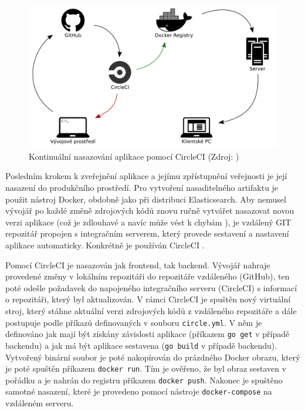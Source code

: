\documentclass[FM,DP]{tulthesis}
\begin{document}
\begin{figure}[h]
\center
\includegraphics[width=\textwidth]{circleci.pdf}
\caption[Kontinuální nasazování aplikace]{Kontinuální nasazování aplikace pomocí CircleCI (Zdroj: \cite{circleci})}
\label{circle-ci}
\end{figure}

Posledním krokem k zveřejnění aplikace a jejímu zpřístupnění veřejnosti je její nasazení 
do produkčního prostředí. Pro vytvoření nasaditelného artifaktu je použit nástroj Docker, 
obdobně jako při distribuci Elasticsearch. Aby nemusel vývojář po každé změně zdrojových
kódů znovu ručně vytvářet nasazovat novou verzi aplikace (což je zdlouhavé a navíc může
vést k chybám \cite[strana~23]{devops}), je vzdálený GIT repozitář propojen s integračním 
serverem, který provede sestavení a nastavení aplikace automaticky. Konkrétně je používán 
CircleCI \cite{circleci}.

Pomocí CircleCI je nasazován jak frontend, tak backend. Vývojář nahraje provedené změny
v lokálním repozitáři do repozitáře vzdáleného (GitHub), ten poté odešle požadavek do
napojeného integračního serveru (CircleCI) s informací o repozitáři, který byl aktualizován.
V rámci CircleCI je spuštěn nový virtuální stroj, který stáhne aktuální verzi zdrojových kódů
z vzdáleného repozitáře a dále postupuje podle příkazů definovaných v souboru \verb|circle.yml|.
V něm je definováno jak mají být získány závislosti aplikace (příkazem \verb|go get| v případě 
backendu) a jak má být aplikace sestavena (\verb|go build| v případě backendu). Vytvořený binární
soubor je poté nakopírován do prázdného Docker obrazu, který je poté spuštěn příkazem \verb|docker run|. 
Tím je ověřeno, že byl obraz sestaven v pořádku a je nahrán do registru příkazem \verb|docker push|.
Nakonec je spuštěno samotné nasazení, které je provedeno pomocí nástroje \verb|docker-compose|
na vzdáleném serveru.
\end{document}
